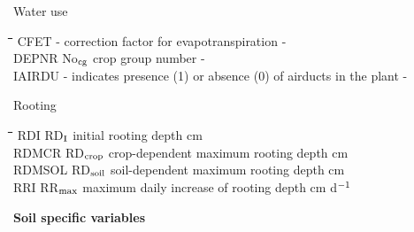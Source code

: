 \documentclass[11pt]{article}
\begin{document}
\bigskip
Water use\nwln
\begin{tabbing}
\hspace{1.27cm}\=\hspace{1.27cm}\=\hspace{1.27cm}\=\hspace{1.27cm}\=%
\hspace{1.27cm}\=\hspace{1.27cm}\=\hspace{1.27cm}\=\hspace{1.27cm}\=%
\hspace{1.27cm}\=\hspace{1.27cm}\=\kill
CFET\> \> -\> correction factor for evapotranspiration\> \> \> \> \> \> \> -\\
DEPNR\> \> No$_{{\rm cg}}$\> crop group number\> \> \> \> \> \> \> -\\
IAIRDU\> \> -\> indicates presence (1) or absence (0) of airducts in the plant\> \> \> \> \> \> \> -
\end{tabbing}

\bigskip
Rooting\nwln
\begin{tabbing}
\hspace{1.27cm}\=\hspace{1.27cm}\=\hspace{1.27cm}\=\hspace{1.27cm}\=%
\hspace{1.27cm}\=\hspace{1.27cm}\=\hspace{1.27cm}\=\hspace{1.27cm}\=%
\hspace{1.27cm}\=\hspace{1.27cm}\=\kill
RDI\> \> RD$_{{\rm I}}$\> initial rooting depth\> \> \> \> \> \> \> cm\\
RDMCR\> \> RD$_{{\rm crop}}$\> crop-dependent maximum rooting depth\> \> \> \> \> \> \> cm\\
RDMSOL\> \> RD$_{{\rm soil}}$\> soil-dependent maximum rooting depth\> \> \> \> \> \> \> cm\\
RRI\> \> RR$_{{\rm max}}$\> maximum daily increase of rooting depth\> \> \> \> \> \> \> cm d$^{{\rm -1}}$
\end{tabbing}
 

\bigskip
{\bf Soil specific variables}
\end{document}

